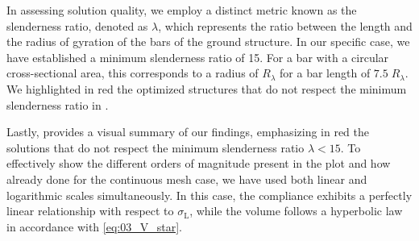 In assessing solution quality, we employ a distinct metric known as the slenderness ratio, denoted as $\lambda$, which represents the ratio between the length and the radius of gyration of the bars of the ground structure. In our specific case, we have established a minimum slenderness ratio of 15. For a bar with a circular cross-sectional area, this corresponds to a radius of $R_\lambda$ for a bar length of $7.5\;R_\lambda$. We highlighted in red the optimized structures that do not respect the minimum slenderness ratio in . 

Lastly,  provides a visual summary of our findings, emphasizing in red the solutions that do not respect the minimum slenderness ratio $\lambda<15$. To effectively show the different orders of magnitude present in the plot and how already done for the continuous mesh case, we have used both linear and logarithmic scales simultaneously. In this case, the compliance exhibits a perfectly linear relationship with respect to $\sigma_\text{L}$, while the volume follows a hyperbolic law in accordance with \eqref{eq:03_V_star}.

